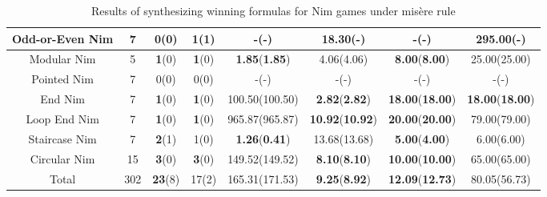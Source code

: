 \documentclass[review]{elsarticle}
\begin{document}
\begin{table}[h!]
\begin{tabular}{|c|c|c|c|c|c|c|c|}
        Odd-or-Even Nim & 7 & 0(0) & \textbf{1}(1) & -(-) & 18.30(-) & -(-) & 295.00(-) \\ \hline
        Modular Nim & 5 & \textbf{1}(0) & \textbf{1}(0) & \textbf{1.85}(\textbf{1.85}) & 4.06(4.06) & \textbf{8.00}(\textbf{8.00}) & 25.00(25.00) \\ \hline
        Pointed Nim & 7 & 0(0) & 0(0) & -(-) & -(-) & -(-) & -(-) \\ \hline
        End Nim & 7 & \textbf{1}(0) & \textbf{1}(0) & 100.50(100.50) & \textbf{2.82}(\textbf{2.82}) & \textbf{18.00}(\textbf{18.00}) & \textbf{18.00}(\textbf{18.00}) \\ \hline
        Loop End Nim & 7 & \textbf{1}(0) & \textbf{1}(0) & 965.87(965.87) & \textbf{10.92}(\textbf{10.92}) & \textbf{20.00}(\textbf{20.00}) & 79.00(79.00) \\ \hline
        Staircase Nim & 7 & \textbf{2}(1) & 1(0) & \textbf{1.26}(\textbf{0.41}) & 13.68(13.68) & \textbf{5.00}(\textbf{4.00}) & 6.00(6.00) \\ \hline
        Circular Nim & 15 & \textbf{3}(0) & \textbf{3}(0) & 149.52(149.52) & \textbf{8.10}(\textbf{8.10}) & \textbf{10.00}(\textbf{10.00}) & 65.00(65.00) \\ \hline
        Total & 302 & \textbf{23}(8) & 17(2) & 165.31(171.53) & \textbf{9.25}(\textbf{8.92}) & \textbf{12.09}(\textbf{12.73}) & 80.05(56.73)\\ \hline
	\end{tabular}
	\caption{Results of synthesizing winning formulas for Nim games under mis\`{e}re rule}
	\label{tab:misere-nim-winFormulas}
\end{table}
\end{document}
